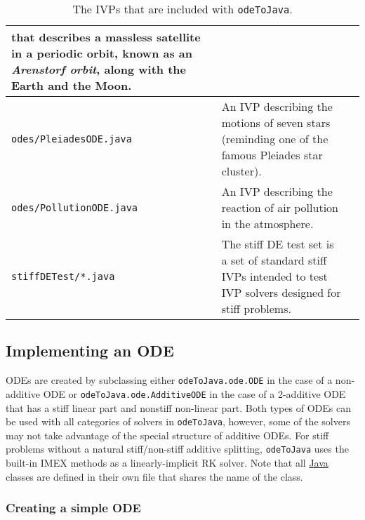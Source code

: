 \documentclass[10pt,letterpaper]{article}
\newcommand\Java{\href{http://www.java.com/en/about/}{\sc Java}}
\newcommand\odj{{\tt odeToJava}}
\begin{document}
\begin{table}
\begin{tabular}{|p{2in}|p{2.5in}|p{0.7in}|}
                                     that describes a massless satellite
                                     in a periodic orbit, known as an
                                     \emph{Arenstorf orbit}, along with
                                     the Earth and the Moon.                                     & \cite{HairerNorsettWanner1993,LeimkuhlerReich2004} \\
\hline
{\tt odes/PleiadesODE.java}       &  An IVP describing the motions of
                                     seven stars (reminding one of the
                                     famous Pleiades star cluster).                              & \cite{HairerNorsettWanner1993,MazziaMagherini2008} \\
\hline
{\tt odes/PollutionODE.java}      &  An IVP describing the reaction of air
                                     pollution in the atmosphere.                                & \cite{HairerNorsettWanner1993,MazziaMagherini2008} \\
\hline
{\tt stiffDETest/*.java}          &  The stiff DE test set is a set of
                                     standard stiff IVPs intended to test
                                     IVP solvers designed for stiff
                                     problems.                                                   & \cite{EnrightPryce1987,EnrightHull1976,Shampine1981} \\
\hline
\end{tabular}
\caption{The IVPs that are included with \odj{}.}
\label{tab:odes}
\end{table}


\subsection{Implementing an ODE}

ODEs are created by subclassing either {\tt odeToJava.ode.ODE} in the case
of a non-additive ODE or {\tt odeToJava.ode.AdditiveODE} in the case of a
2-additive ODE that has a stiff linear part and nonstiff non-linear part. Both
types of ODEs can be used with all categories of solvers in \odj, however, some
of the solvers may not take advantage of the special structure of additive ODEs.
For stiff problems without a natural stiff/non-stiff additive splitting, \odj{}
uses the built-in IMEX methods as a linearly-implicit RK solver. Note that all
\Java{} classes are defined in their own file that shares the name of the class.

\subsubsection{Creating a simple ODE}\label{sec:single}
\end{document}
